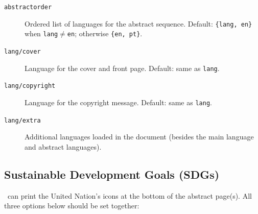 \begin{description}
  \item[\texttt{abstractorder}] Ordered list of languages for the abstract
    sequence.  Default: \texttt{\{lang, en\}} when \texttt{lang}$\neq$\texttt{en};
    otherwise \texttt{\{en, pt\}}.
\begin{latexcode}
\end{latexcode}

  \item[\texttt{lang/cover}] Language for the cover and front page.
    Default: same as \texttt{lang}.
\begin{latexcode}
\end{latexcode}

  \item[\texttt{lang/copyright}] Language for the copyright message.
    Default: same as \texttt{lang}.

  \item[\texttt{lang/extra}] Additional languages loaded in the document
    (besides the main language and abstract languages).
\begin{latexcode}
\end{latexcode}
\end{description}

\subsection{Sustainable Development Goals (SDGs)}
\label{sub:sdgs}

\novathesis\ can print the United Nation's  icons at the bottom of the abstract page(s).  All three options
below should be set together:
\begin{latexcode}
\end{latexcode}

